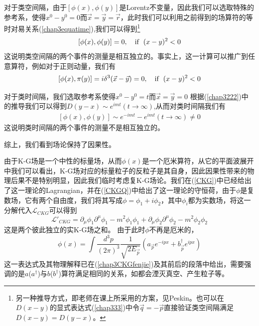 对于类空间隔，由于$\left[\phi(x),\phi(y)\right]$是Lorentz不变量，因此我们可以选取特殊的参考系，使得$x^{0}-y^{0}=0$而$\vec{x}=\vec{y}=\vec{r}$，此时我们可以利用之前得到的场算符的等时对易关系(\ref{chap3equatime}),我们可以得到\footnote{另一种推导方式，即老师在课上所采用的方案，见Peskin。也可以在$D(x-y)$的显式表达式(\ref{chap333})中令$\vec{q}=-\vec{p}$直接验证类空间隔满足$D(x-y)=D(y-x)$。}
\begin{equation}
\left[\phi(x),\phi(y)\right]=0,\quad {\rm if}\;\; (x-y)^{2}<0
\end{equation}
这说明类空间隔的两个事件的测量是相互独立的。事实上，这一计算可以推广到任意算符，例如对于正则动量，我们有
\begin{equation}
\left[\phi(x),\pi(y)\right]=i\delta^{3}(\vec{x}-\vec{y})=0,\quad {\rm if}\;\; (x-y)^{2}<0
\end{equation}

对于类时间隔，我们选取参考系使得$x^{0}-y^{0}=t$而$\vec{x}=\vec{y}=0$
根据(\ref{chap3222})中的推导我们可以得到$D(y-x)\sim e^{imt}(t\rightarrow \infty)$,从而对类时间隔我们有
\begin{equation}
    \begin{aligned}
        \left[\phi(x),\phi(y)\right]\sim e^{-imt}-e^{imt}(t\rightarrow \infty)\neq0
    \end{aligned}
\end{equation}
这说明类时间隔的两个事件的测量不是相互独立的。

综上，我们看到场论保持了因果性。

由于K-G场是一个中性的标量场，从而$\phi(x)$是一个厄米算符，从它的平面波展开中我们可以看出，K-G场对应的标量粒子的反粒子是其自身，因此因果性带来的物理后果不是特别明显，因此我们临时考虑复K-G场论。我们在(\ref{CKG})中已经给出了这一理论的Lagrangian，并在(\ref{CKGQ})中给出了这一理论的守恒荷，由于$\phi$是复数场，它有两个自由度，我们将其写成$\phi=\phi_{1}+i\phi_{2}$，其中$\phi_{i}$都为实数场，将这一分解代入$\mathcal{L}_{CKG}$可以得到
\begin{equation}
    \mathcal{L}'_{CKG}=\partial_{\mu}\phi_{1}\partial^{\mu}\phi_{1}-m^{2}\phi_{1}\phi_{1}+\partial_{\mu}\phi_{2}\partial^{\mu}\phi_{2}-m^{2}\phi_{2}\phi_{2}
\end{equation}
这是两个彼此独立的实K-G场之和。
由于此时$\phi$不再是厄米的，
\begin{equation}
    \phi(x)=\int \frac{d^{3}p}{(2\pi)^{3}}\frac{1}{\sqrt{2E_{\vec{p}}}}\left(a_{\vec{p}}e^{-ipx}+b^{\dagger}_{\vec{p}}e^{ipx}\right)
\end{equation}
这一表达式及其物理解释已在(\ref{chap3CKGfenjie})及其前后的段落中给出，需要强调的是$a$($a^{\dagger}$)与$b$($b^{\dagger}$)算符满足相同的关系，如都会湮灭真空、产生粒子等。

